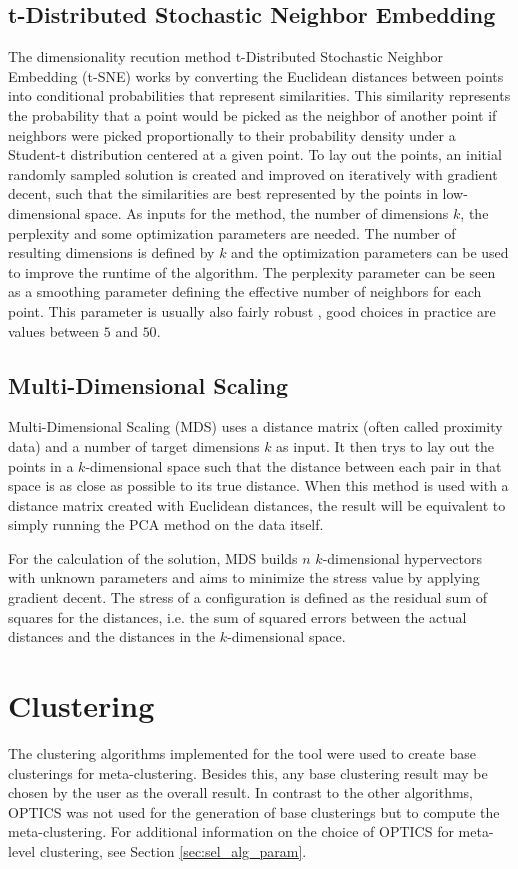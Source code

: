 \documentclass[
	a4paper,
	english,
	twoside,
	openright,               
	11pt                            
	]{report}
\begin{document}
\subsection{t-Distributed Stochastic Neighbor Embedding}
The dimensionality recution method t-Distributed Stochastic Neighbor Embedding (t-SNE) \cite{Maaten2008VisualizingDU} works by converting the Euclidean distances between points into conditional probabilities that represent similarities. This similarity represents the probability that a point would be picked as the neighbor of another point if neighbors were picked proportionally to their probability density under a Student-t distribution centered at a given point. To lay out the points, an initial randomly sampled solution is created and improved on iteratively with gradient decent, such that the similarities are best represented by the points in low-dimensional space. As inputs for the method, the number of dimensions $k$, the perplexity and some optimization parameters are needed. The number of resulting dimensions is defined by $k$ and the optimization parameters can be used to improve the runtime of the algorithm. The perplexity parameter can be seen as a smoothing parameter defining the effective number of neighbors for each point. This parameter is usually also fairly robust \cite{Maaten2008VisualizingDU}, good choices in practice are values between $5$ and $50$.

\subsection{Multi-Dimensional Scaling}
Multi-Dimensional Scaling (MDS) \cite{mds} uses a distance matrix (often called proximity data) and a number of target dimensions $k$ as input. It then trys to lay out the points in a $k$-dimensional space such that the distance between each pair in that space is as close as possible to its true distance. When this method is used with a distance matrix created with Euclidean distances, the result will be equivalent to simply running the PCA method on the data itself. 

For the calculation of the solution, MDS builds $n$ $k$-dimensional hypervectors with unknown parameters and aims to minimize the stress value by applying gradient decent. The stress of a configuration is defined as the residual sum of squares for the distances, i.e. the sum of squared errors between the actual distances and the distances in the $k$-dimensional space.

\section{Clustering}
The clustering algorithms implemented for the tool were used to create base clusterings for meta-clustering. Besides this, any base clustering result may be chosen by the user as the overall result. In contrast to the other algorithms, OPTICS was not used for the generation of base clusterings but to compute the meta-clustering. For additional information on the choice of OPTICS for meta-level clustering, see Section \ref{sec:sel_alg_param}.
\end{document}
